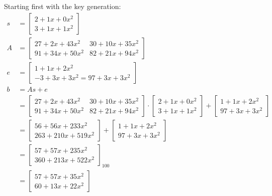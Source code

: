 Starting first with the key generation:
\begin{align*}
  s  & = \begin{bmatrix}2+ 1x + 0x^2 \\ 3+1x+1x^2 \end{bmatrix}                                 \\
  A  & = \begin{bmatrix}27+2x+43x^2 & 30+10x+35x^2 \\ 91+34x+50x^2 & 82+21x+94x^2 \end{bmatrix} \\
  e  & = \begin{bmatrix}1+1x+2x^2 \\ -3+3x+3x^2=97+3x+3x^2 \end{bmatrix}                        \\
  b  & = As+e                                                                                   \\
     & = \begin{bmatrix}27+2x+43x^2 & 30+10x+35x^2 \\ 91+34x+50x^2 & 82+21x+94x^2 \end{bmatrix}
  \cdot
  \begin{bmatrix}2+ 1x + 0x^2 \\ 3+1x+1x^2 \end{bmatrix}
  +
  \begin{bmatrix}1+1x+2x^2 \\ 97+3x+3x^2 \end{bmatrix}
  \\
     & = 
  \begin{bmatrix}
    56+56x+233x^2 \\
    263+210x+519x^2
  \end{bmatrix}
  + 
  \begin{bmatrix}1+1x+2x^2 \\ 97+3x+3x^2 \end{bmatrix}                                          \\
     & =   \begin{bmatrix}
             57+57x+235x^2 \\
             360+213x+522x^2
           \end{bmatrix}_{100}                                                                  \\
     & = \begin{bmatrix}
           57+57x+35x^2 \\
           60+13x+22x^2

\end{bmatrix}
\end{align*}
